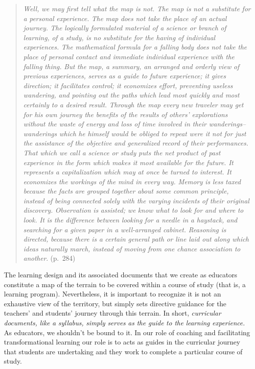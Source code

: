 \documentclass[
]{book}
\begin{document}
\begin{quote}
\emph{Well, we may first tell what the map is not. The map is not a substitute for a personal experience. The map does not take the place of an actual journey. The logically formulated material of a science or branch of learning, of a study, is no substitute for the having of individual experiences. The mathematical formula for a falling body does not take the place of personal contact and immediate individual experience with the falling thing. But the map, a summary, an arranged and orderly view of previous experiences, serves as a guide to future experience; it gives direction; it facilitates control; it economizes effort, preventing useless wandering, and pointing out the paths which lead most quickly and most certainly to a desired result. Through the map every new traveler may get for his own journey the benefits of the results of others' explorations without the waste of energy and loss of time involved in their wanderings--wanderings which he himself would be obliged to repeat were it not for just the assistance of the objective and generalized record of their performances. That which we call a science or study puts the net product of past experience in the form which makes it most available for the future. It represents a capitalization which may at once be turned to interest. It economizes the workings of the mind in every way. Memory is less taxed because the facts are grouped together about some common principle, instead of being connected solely with the varying incidents of their original discovery. Observation is assisted; we know what to look for and where to look. It is the difference between looking for a needle in a haystack, and searching for a given paper in a well-arranged cabinet. Reasoning is directed, because there is a certain general path or line laid out along which ideas naturally march, instead of moving from one chance association to another.} (p.~284)
\end{quote}

The learning design and its associated documents that we create as educators constitute a map of the terrain to be covered within a course of study (that is, a learning program). Nevertheless, it is important to recognize it is not an exhaustive view of the territory, but simply sets directive guidance for the teachers' and students' journey through this terrain. In short, \emph{curricular documents, like a syllabus, simply serves as the guide to the learning experience.} As educators, we shouldn't be bound to it. In our role of coaching and facilitating transformational learning our role is to acts as guides in the curricular journey that students are undertaking and they work to complete a particular course of study.
\end{document}
